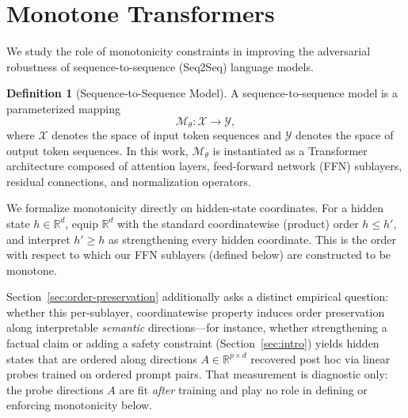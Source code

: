 \documentclass{article}
\theoremstyle{plain}
\theoremstyle{definition}
\newtheorem{definition}[theorem]{Definition}
\theoremstyle{remark}
\begin{document}
\section{Monotone Transformers}
\label{Prelim}
We study the role of monotonicity constraints in improving the adversarial robustness of sequence-to-sequence (Seq2Seq) language models.
\begin{definition}[Sequence-to-Sequence Model]
A sequence-to-sequence model is a parameterized mapping
\[
\mathcal{M}_\theta : \mathcal{X} \to \mathcal{Y},
\]
where $\mathcal{X}$ denotes the space of input token sequences and $\mathcal{Y}$ denotes the space of output token sequences. In this work, $\mathcal{M}_\theta$ is instantiated as a Transformer architecture composed of attention layers, feed-forward network (FFN) sublayers, residual connections, and normalization operators.
\end{definition}


We formalize monotonicity directly on hidden-state coordinates. For a hidden state $h \in \mathbb{R}^d$, equip $\mathbb{R}^d$ with the standard coordinatewise (product) order $h \le h'$, and interpret $h' \ge h$ as strengthening every hidden coordinate. This is the order with respect to which our FFN sublayers (defined below) are constructed to be monotone.

Section~\ref{sec:order-preservation} additionally asks a distinct empirical question: whether this per-sublayer, coordinatewise property induces order preservation along interpretable \emph{semantic} directions—for instance, whether strengthening a factual claim or adding a safety constraint (Section~\ref{sec:intro}) yields hidden states that are ordered along directions $A \in \mathbb{R}^{p \times d}$ recovered post hoc via linear probes trained on ordered prompt pairs. That measurement is diagnostic only: the probe directions $A$ are fit \emph{after} training and play no role in defining or enforcing monotonicity below.
\end{document}
